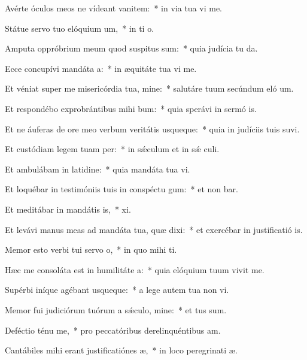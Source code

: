 \item Avérte óculos meos ne vídeant vanitem:~* in via tua vi me.
\item Státue servo tuo elóquium um,~* in ti o.
\item Amputa oppróbrium meum quod suspitus sum:~* quia judícia tu da.
\item Ecce concupívi mandáta a:~* in æquitáte tua vi me.
\item Et véniat super me misericórdia tua, mine:~* salutáre tuum secúndum eló um.
\item Et respondébo exprobrántibus mihi bum:~* quia sperávi in sermó is.
\item Et ne áuferas de ore meo verbum veritátis usqueque:~* quia in judíciis tuis suvi.
\item Et custódiam legem tuam per:~* in sǽculum et in sǽ culi.
\item Et ambulábam in latidine:~* quia mandáta tua vi.
\item Et loquébar in testimóniis tuis in conspéctu gum:~* et non bar.
\item Et meditábar in mandátis is,~*  xi.
\item Et levávi manus meas ad mandáta tua, quæ dixi:~* et exercébar in justificatió is.
\item Memor esto verbi tui servo o,~* in quo mihi  ti.
\item Hæc me consoláta est in humilitáte a:~* quia elóquium tuum vivit me.
\item Supérbi iníque agébant usqueque:~* a lege autem tua non vi.
\item Memor fui judiciórum tuórum a sǽculo, mine:~* et tus sum.
\item Deféctio ténu me,~* pro peccatóribus derelinquéntibus  am.
\item Cantábiles mihi erant justificatiónes æ,~* in loco peregrinati æ.
